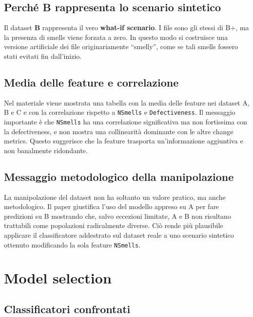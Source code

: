 \subsection{Perché B rappresenta lo scenario sintetico}

Il dataset \textbf{B} rappresenta il vero \textbf{what-if scenario}. I file sono gli stessi di B+, ma la presenza di smells viene forzata a zero. In questo modo si costruisce una versione artificiale dei file originariamente ``smelly'', come se tali smells fossero stati evitati fin dall'inizio.

\subsection{Media delle feature e correlazione}

\begin{notaslide}
Nel materiale viene mostrata una tabella con la media delle feature nei dataset A, B e C e con la correlazione rispetto a \texttt{NSmells} e \texttt{Defectiveness}. Il messaggio importante è che \texttt{NSmells} ha una correlazione significativa ma non fortissima con la defectiveness, e non mostra una collinearità dominante con le altre change metrics. Questo suggerisce che la feature trasporta un'informazione aggiuntiva e non banalmente ridondante.
\end{notaslide}

\subsection{Messaggio metodologico della manipolazione}

La manipolazione del dataset non ha soltanto un valore pratico, ma anche metodologico. Il paper giustifica l'uso del modello appreso su A per fare predizioni su B mostrando che, salvo eccezioni limitate, A e B non risultano trattabili come popolazioni radicalmente diverse. Ciò rende più plausibile applicare il classificatore addestrato sul dataset reale a uno scenario sintetico ottenuto modificando la sola feature \texttt{NSmells}.

\section{Model selection}

\subsection{Classificatori confrontati}

